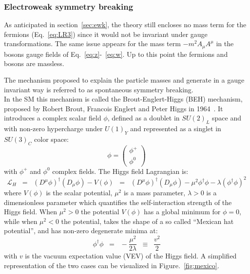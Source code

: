 \subsubsection{Electroweak symmetry breaking}\label{sec:symBreaking}
As anticipated in section~\ref{sec:ewk}, the theory still encloses no mass term for the fermions (Eq.~\ref{eq:LR3}) since it would not be invariant under gauge transformations. The same issue appears for the mass term $-m^2A_{\mu}A^{\mu}$ in the bosons gauge fields of Eq.~\ref{eq:z}-~\ref{eq:w}. Up to this point the fermions and bosons are massless.

The mechanism proposed to explain the particle masses and generate in a gauge invariant way is referred to as spontaneous symmetry breaking.\\
In the SM this mechanism is called the Brout-Englert-Higgs (BEH) mechanism, proposed by Robert Brout, Francois Englert and Peter Higgs in 1964~\cite{PhysRevLett.13.321,PhysRevLett.13.508}. It introduces a complex scalar field $\phi$, defined as a doublet in $SU(2)_{L}$ space and with non-zero hypercharge under $U(1)_Y$ and represented as a singlet in $SU(3)_{C}$ color space:
\begin{equation}
\label{eq:higgsphi}
\phi = \begin{pmatrix}
\phi^+\\
\phi^0
\end{pmatrix}
\end{equation}
with $\phi^+$ and $\phi^0$ complex fields. The Higgs field Lagrangian is:
\begin{equation}
\label{eq:higgsL}
 \mathcal{L}_{H} \;\; = \;\; (D^{\mu}\phi)^\dag (D_{\mu}\phi) - V(\phi) \;\; = \;\; (D^{\mu}\phi)^\dag (D_{\mu}\phi) - \mu^2\phi^\dag \phi - \lambda(\phi^\dag \phi)^2
\end{equation}
where $V(\phi)$ is the scalar potential, $\mu^2$ is a mass parameter, $\lambda > 0$ is a dimensionless parameter which quantifies the self-interaction strength of the Higgs field. When $\mu^2 > 0$ the potential $V(\phi)$ has a global minimum for $\phi = 0$, while when $\mu^2 < 0$ the potential, takes the shape of a so called ``Mexican hat potential'', and has non-zero degenerate minima at:
\begin{equation}
\label{eq:higgsM}
\phi^\dag \phi \;\; = \;\; - \frac{\mu^2}{2\lambda} \;\; \equiv \;\; \frac{v^2}{2}
\end{equation}
with $v$ is the vacuum expectation value (VEV) of the Higgs field. A simplified representation of the two cases can be visualized in Figure.~\ref{fig:mexico}.

